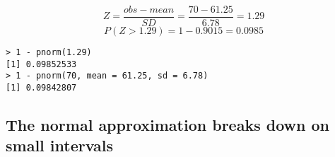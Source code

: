 \documentclass[slidestop,compress,mathserif]{beamer}
\makeatletter
\def\chpiv@path{../../Chp 4}
\makeatother
\begin{document}

\begin{frame}[fragile]
\frametitle{}


{
\[ Z = \frac{obs - mean}{SD} = \frac{70 - 61.25}{6.78} = 1.29 \]
\[ P(Z > 1.29) = 1 - 0.9015 = 0.0985 \]
}

\begin{beamerboxesrounded}[shadow = true, lower = code body]{}
{\small \begin{verbatim}
> 1 - pnorm(1.29)
[1] 0.09852533
> 1 - pnorm(70, mean = 61.25, sd = 6.78)
[1] 0.09842807
\end{verbatim}
}
\end{beamerboxesrounded}

\end{frame}


\subsection{The normal approximation breaks down on small intervals}

\end{document}
